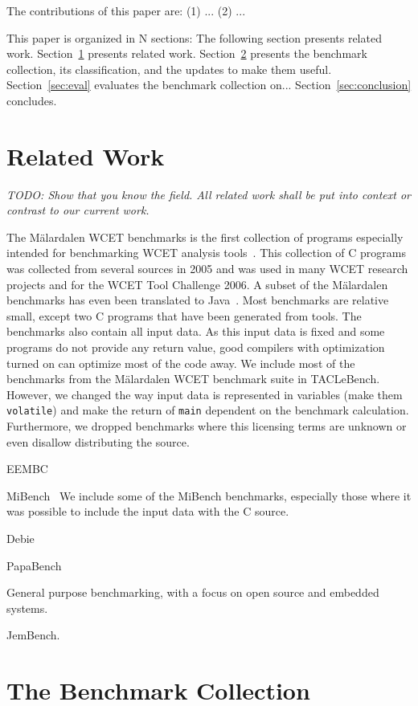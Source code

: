 \documentclass[a4paper,UKenglish]{oasics}
\newcommand{\todo}[1]{{\emph{TODO: #1}}}
\newcommand{\code}[1]{{\small{\texttt{#1}}}}
\begin{document}
The contributions of this paper are: (1) ... (2) ...

This paper is organized in N sections: The following section presents related work.
Section~\ref{sec:related} presents related work.
Section~\ref{sec:collect} presents the benchmark collection, its classification, and the updates
to make them useful.
Section~\ref{sec:eval} evaluates the benchmark collection on...
Section~\ref{sec:conclusion} concludes.

\section{Related Work}
\label{sec:related}

\todo{Show that you know the field. All related work shall be put
into context or contrast to our current work.}

The M{\"a}lardalen WCET benchmarks is the first collection of programs especially
intended for benchmarking WCET analysis tools~\cite{wcet:bench:2012}.
This collection of C programs was collected from several sources in 2005 and
was used in many WCET research projects and for the WCET Tool Challenge 2006.
A subset of the M{\"a}lardalen benchmarks has even been translated to
Java~\cite{jop:volta:rtas2008}. Most benchmarks are relative small, except
two C programs that have been generated from tools. The benchmarks also
contain all input data. As this input data is fixed and some programs do not provide
any return value, good compilers with optimization turned on can optimize
most of the code away. We include most of the benchmarks from the
 M{\"a}lardalen WCET benchmark suite in TACLeBench. However, we changed
 the way input data is represented in variables (make them \code{volatile})
 and make the return of \code{main} dependent on the benchmark calculation.
 Furthermore, we dropped benchmarks where this licensing terms are unknown
 or even disallow distributing the source.

EEMBC

MiBench~\cite{MiBench} We include some of the MiBench benchmarks, especially
those where it was possible to include the input data with the C source.

Debie~\cite{debie}

PapaBench~\cite{papabench}

General purpose benchmarking, with a focus on open source and embedded systems.

JemBench.

\section{The Benchmark Collection}
\label{sec:collect}
\end{document}
